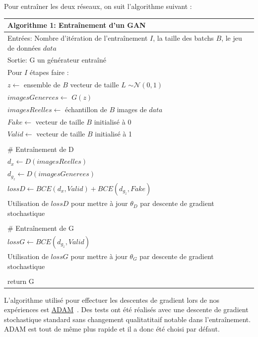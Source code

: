 \documentclass[11pt,francais]{article}
\begin{document}
\newpage
Pour entraîner les deux réseaux, on suit l'algorithme suivant :
\begin{table}[h!]
  \begin{tabular}{l}
  \hline
  Algorithme 1: Entraînement d'un GAN\tabularnewline
  \hline
  Entrées: Nombre d'itération de l'entraînement  \(I\), la taille des batchs \(B\), le jeu de données \(data\)  \tabularnewline
  Sortie: G un générateur entraîné \tabularnewline
  \hline
  Pour \(I\) étapes faire :\tabularnewline 
  \hspace{1cm}\(z \leftarrow\) ensemble de \(B\) vecteur de taille \(L\) \(\sim \mathcal{N}(0,1)\)\tabularnewline
  \hspace{1cm}\(imagesGenerees \leftarrow\) \(G(z)\)\tabularnewline  
  \hspace{1cm}\(imagesReelles \leftarrow\) échantillon de \(B\) images de \(data\)\tabularnewline
  \hspace{1cm}\(Fake \leftarrow\) vecteur de taille \(B\) initialisé à 0\tabularnewline
  \hspace{1cm}\(Valid \leftarrow\) vecteur de taille \(B\) initialisé à 1\tabularnewline
  \tabularnewline
  \hspace{1cm}\# Entraînement de D\tabularnewline
  \hspace{1cm}\(d_x \leftarrow D(imagesReelles)\)\tabularnewline
  \hspace{1cm}\(d_{g_z} \leftarrow D(imagesGenerees)\)\tabularnewline
  \hspace{1cm}\(lossD \leftarrow BCE(d_x,Valid) + BCE(d_{g_z},Fake)\)\tabularnewline
  \hspace{1cm}Utilisation de \(lossD\) pour mettre à jour \(\theta_D\) par descente de gradient stochastique\tabularnewline
  \tabularnewline
  \hspace{1cm}\# Entraînement de G\tabularnewline
  \hspace{1cm}\(lossG\leftarrow BCE(d_{g_z},Valid)\)\tabularnewline
  \hspace{1cm}Utilisation de \(lossG\) pour mettre à jour \(\theta_G\) par descente de gradient stochastique\tabularnewline
  \tabularnewline
  return G\tabularnewline
  \hline
  \end{tabular}
  \label{tab:tab1}
\end{table}

L'algorithme utilisé pour effectuer les descentes de gradient lors de nos expériences est \href{https://arxiv.org/pdf/1412.6980.pdf}{ADAM}~\cite{kingma2014adam}. Des tests ont été réalisés avec une descente de gradient stochastique standard sans changement qualitatitaif notable dans l'entraînement. ADAM est tout de même plus rapide et il a donc été choisi par défaut.
\end{document}
